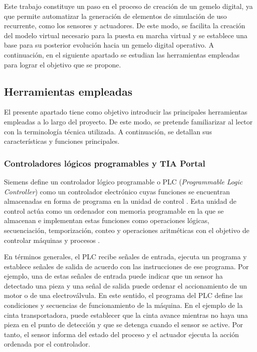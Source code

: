 Este trabajo constituye un paso en el proceso de creación de un gemelo digital, ya que permite automatizar la generación de elementos de simulación de uso recurrente, como los sensores y actuadores. De este modo, se facilita la creación del modelo virtual necesario para la puesta en marcha virtual y se establece una base para su posterior evolución hacia un gemelo digital operativo. A continuación, en el siguiente apartado se estudian las herramientas empleadas para lograr el objetivo que se propone. \\


\subsection{Herramientas empleadas} \label{subsec:herramientas}

El presente apartado tiene como objetivo introducir las principales herramientas empleadas a lo largo del proyecto. De este modo, se pretende familiarizar al lector con la terminología técnica utilizada. A continuación, se detallan sus características y funciones principales.

\subsubsection{Controladores lógicos programables y TIA Portal} \label{subsec:plc}

Siemens define un controlador lógico programable o PLC (\textit{Programmable Logic Controller}) como un controlador electrónico cuyas funciones se encuentran almacenadas en forma de programa en la unidad de control . Esta unidad de control actúa como un ordenador con memoria programable en la que se almacenan e implementan estas funciones como operaciones lógicas, secuenciación, temporización, conteo y operaciones aritméticas con el objetivo de controlar máquinas y procesos .

En términos generales, el PLC recibe señales de entrada, ejecuta un programa y establece señales de salida de acuerdo con las instrucciones de ese programa. Por ejemplo, una de estas señales de entrada puede indicar que un sensor ha detectado una pieza y una señal de salida puede ordenar el accionamiento de un motor o de una electroválvula. En este sentido, el programa del PLC define las condiciones y secuencias de funcionamiento de la máquina. En el ejemplo de la cinta transportadora, puede establecer que la cinta avance mientras no haya una pieza en el punto de detección y que se detenga cuando el sensor se active. Por tanto, el sensor informa del estado del proceso y el actuador ejecuta la acción ordenada por el controlador.

